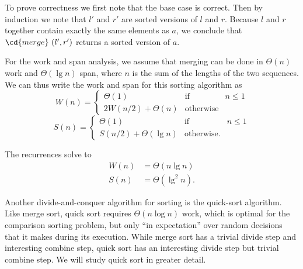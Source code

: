 \begin{cluster}
\label{grp:grm:design::dc::correctness-and-cost}

\begin{gram}
\label{grm:design::dc::correctness-and-cost}
To prove correctness we first note that the base case is correct.
Then by induction we note that $l'$ and $r'$ are sorted
versions of $l$ and $r$.
Because $l$ and $r$ together contain exactly the same elements as $a$,
we conclude that $\cd{merge}~(l',r')$ returns a sorted version of $a$.


For the work and span analysis, we assume that merging can be done in $\Theta(n)$ work and $\Theta(\lg{n})$ span, where $n$ is the sum of the lengths of the two sequences.
We can thus write the work and span for this sorting algorithm
as
\[
W(n) = \left\{
\begin{array}{lll}
\Theta(1) & \mbox{if} & n \le 1
\\
2W(n/2) + \Theta(n) &  \mbox{otherwise}
\end{array}
\right.
\]
\[
S(n) = \left\{
\begin{array}{lll}
\Theta(1) & \mbox{if} & n \le 1
\\
S(n/2) + \Theta(\lg{n}) &  \mbox{otherwise}.
\end{array}
\right.
\]

The recurrences solve to
\[ \begin{align*}
W(n) & = \Theta(n\lg{n})
\\
S(n) & = \Theta(\lg^2{n}).
\end{align*} \]

\end{gram}
\end{cluster}

\begin{cluster}
\label{grp:rmrk:design::dc::quick-sort}

\begin{remark}
\label{rmrk:design::dc::quick-sort}
Another divide-and-conquer algorithm for sorting is the quick-sort
algorithm.
Like merge sort, quick sort requires $\Theta(n \log n)$ work, which
is optimal for the comparison sorting problem, but only ``in expectation'' over random decisions that it makes during its execution.
While merge sort has a trivial divide step and interesting combine
step, quick sort has an interesting divide step but trivial combine
step.
We will study quick sort in greater detail.

\end{remark}
\end{cluster}



